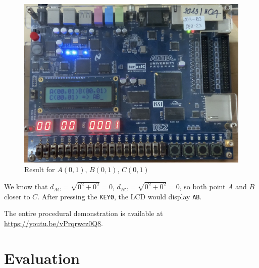 \documentclass[12pt,a4paper,oneside]{book} %
\begin{document}
 \begin{figure}[H]
    \begin{center}
    \includegraphics[width=.8\textwidth]{images/timer5.jpg}
    \caption{Result for $A(0,1)$, $B(0,1)$, $C(0,1)$}
    \end{center}
\end{figure}
We know that $d_{AC} = \sqrt{0^2 + 0^2} = 0$, $d_{BC} = \sqrt{0^2 + 0^2} = 0$, so both point $A$ and $B$ closer to $C$. After pressing the \texttt{KEY0}, the LCD would display \texttt{AB}.

The entire procedural demonstration is available at \url{https://youtu.be/vPrqrwcz0Q8}.

\chapter{Evaluation}
\end{document}
